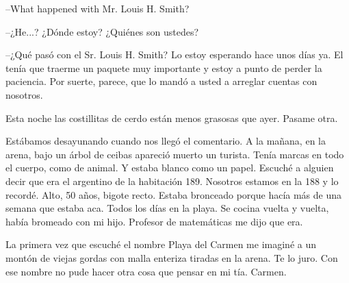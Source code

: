 \documentclass[12pt,twoside,openright,a5paper]{book}
\begin{document}
\vspace{0.5cm}
\hrulefill\hspace{0.2cm} \decofourleft\decofourright \hspace{0.2cm} \hrulefill
\vspace{0.5cm}

\---What happened with Mr. Louis H. Smith?

\---¿He...? ¿Dónde estoy? ¿Quiénes son ustedes?

\---¿Qué pasó con el Sr. Louis H. Smith? Lo estoy esperando hace
unos días ya. El tenía que traerme un paquete muy importante y estoy a
punto de perder la paciencia. Por suerte, parece, que lo mandó a usted a arreglar
cuentas con nosotros.


\vspace{0.5cm}
\hrulefill\hspace{0.2cm} \decofourleft\decofourright \hspace{0.2cm} \hrulefill
\vspace{0.5cm}

Esta noche las costillitas de cerdo están menos grasosas que ayer. Pasame
otra.


\vspace{0.5cm}
\hrulefill\hspace{0.2cm} \decofourleft\decofourright \hspace{0.2cm} \hrulefill
\vspace{0.5cm}

Estábamos desayunando cuando nos llegó el comentario. A la mañana, en la
arena, bajo un árbol de ceibas apareció muerto un turista. Tenía marcas
en todo el cuerpo, como de animal. Y estaba blanco como un papel. Escuché
a alguien decir que era el argentino de la habitación 189. Nosotros estamos
en la 188 y lo recordé. Alto, 50 años, bigote recto. Estaba bronceado
porque hacía más de una semana que estaba aca. Todos los días en la
playa. Se cocina vuelta y vuelta, había bromeado con mi hijo. Profesor de
matemáticas me dijo que era.


\vspace{0.5cm}
\hrulefill\hspace{0.2cm} \decofourleft\decofourright \hspace{0.2cm} \hrulefill
\vspace{0.5cm}

La primera vez que escuché el nombre Playa del Carmen me imaginé a un
montón de viejas gordas con malla enteriza tiradas en la arena. Te lo
juro. Con ese nombre no pude hacer otra cosa que pensar en mi tía. Carmen.
\end{document}
